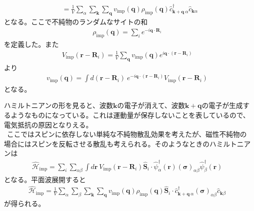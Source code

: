 \documentclass[dvipdfmx, 11pt, a4paper]{jsarticle}
\theoremstyle{definition}
\numberwithin{equation}{section}
\begin{document}
\begin{derivationBox}
\begin{align}
            &= \frac{1}{V} \sum_{\alpha} \sum_{\bm{k}}\sum_{\bm{q}}      v_{\text{imp}}(\bm{q}) \rho_{\text{imp}}(\bm{q})\hat{c}^\dagger_{\bm{k}+\bm{q}\ \alpha} \hat{c}_{\bm{k}\alpha}
        \end{align}
        となる。ここで不純物のランダムなサイトの和
        \begin{align}
            \rho_{\text{imp}}(\bm{q}) = \sum_ie^{-i\bm{q}\cdot\bm{R}_i}
        \end{align}
        を定義した。また
        \begin{align}
            V_{\text{imp}}(\bm{r}-\bm{R}_i) = \frac{1}{V} \sum_{\bm{q}} v_{\text{imp}}(\bm{q}) e^{i\bm{q}\cdot(\bm{r}-\bm{R}_i)}
        \end{align}
        より
        \begin{align}
            v_{\text{imp}}(\bm{q}) = \int d(\bm{r}-\bm{R}_i)\ e^{-i\bm{q}\cdot(\bm{r}-\bm{R}_i)}V_{\text{imp}}(\bm{r}-\bm{R}_i)
        \end{align}
        となる。
    \end{derivationBox}
    ハミルトニアンの形を見ると、波数$\bm{k}$の電子が消えて、波数$\bm{k}+\bm{q}$の電子が生成するようなものになっている。これは運動量が保存しないことを表しているので、電気抵抗の原因となりえる。\\
    $\ \ $ここではスピンに依存しない単純な不純物散乱効果を考えたが、磁性不純物の場合にはスピンを反転させる散乱も考えられる。そのようなときのハミルトニアンは
    \begin{align}
        \hat{\mathscr{H}}_{\text{imp}} = \sum_{i}\sum_{\alpha \beta} \int d\bm{r}\ V_{\text{imp}}(\bm{r}-\bm{R}_i) \hat{\bm{S}}_i \cdot \hat{\psi}_\alpha^\dagger(\bm{r}) (\bm{\sigma})_{\alpha \beta} \hat{\psi}^\dagger_\beta(\bm{r})
    \end{align}
    となる。平面波展開すると
    \begin{align}
        \hat{\mathscr{H}}_{\text{imp}} = \frac{1}{V} \sum_{\alpha} \sum_{\beta}\sum_{\bm{k}}\sum_{\bm{q}}      v_{\text{imp}}(\bm{q}) \rho_{\text{imp}}(\bm{q})\hat{\bm{S}}_i \cdot \hat{c}^\dagger_{\bm{k}+\bm{q}\ \alpha} (\bm{\sigma})_{\alpha \beta} \hat{c}_{\bm{k}\beta}
    \end{align}
    が得られる。
\end{document}

